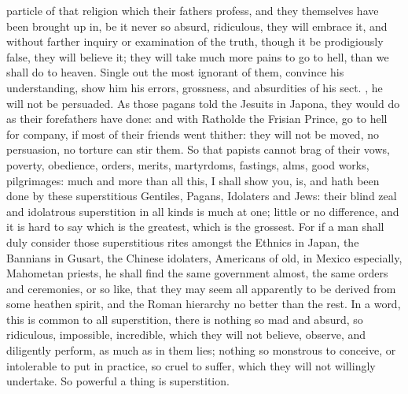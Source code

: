{particle of that religion which their fathers profess, and they
themselves have been brought up in, be it never so absurd, ridiculous,
they will embrace it, and without farther inquiry or examination of the
truth, though it be prodigiously false, they will believe it; they will
take much more pains to go to hell, than we shall do to heaven. Single
out the most ignorant of them, convince his understanding, show him his
errors, grossness, and absurdities of his sect. , he will not be persuaded. As those pagans told the Jesuits
in Japona, they would do as their forefathers have done: and with
Ratholde the Frisian Prince, go to hell for company, if most of their
friends went thither: they will not be moved, no persuasion, no torture
can stir them. So that papists cannot brag of their vows, poverty,
obedience, orders, merits, martyrdoms, fastings, alms, good works,
pilgrimages: much and more than all this, I shall show you, is, and
hath been done by these superstitious Gentiles, Pagans, Idolaters and
Jews: their blind zeal and idolatrous superstition in all kinds is much
at one; little or no difference, and it is hard to say which is the
greatest, which is the grossest. For if a man shall duly consider those
superstitious rites amongst the Ethnics in Japan, the Bannians in
Gusart, the Chinese idolaters, Americans of old, in Mexico
especially, Mahometan priests, he shall find the same government
almost, the same orders and ceremonies, or so like, that they may seem
all apparently to be derived from some heathen spirit, and the Roman
hierarchy no better than the rest. In a word, this is common to all
superstition, there is nothing so mad and absurd, so ridiculous,
impossible, incredible, which they will not believe, observe, and
diligently perform, as much as in them lies; nothing so monstrous to
conceive, or intolerable to put in practice, so cruel to suffer, which
they will not willingly undertake. So powerful a thing is superstition.

}
